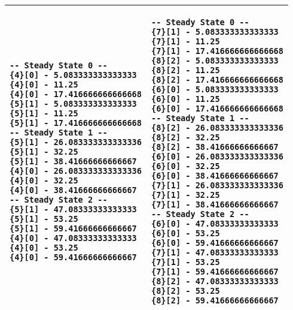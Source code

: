 \begin{center}
    \begin{tabular}{ | p{5cm} | p{5cm} | }
	\hline
	\begin{verbatim}
-- Steady State 0 --
{4}[0] - 5.083333333333333
{4}[0] - 11.25
{4}[0] - 17.416666666666668
{5}[1] - 5.083333333333333
{5}[1] - 11.25
{5}[1] - 17.416666666666668
-- Steady State 1 --
{5}[1] - 26.083333333333336
{5}[1] - 32.25
{5}[1] - 38.41666666666667
{4}[0] - 26.083333333333336
{4}[0] - 32.25
{4}[0] - 38.41666666666667
-- Steady State 2 --
{5}[1] - 47.08333333333333
{5}[1] - 53.25
{5}[1] - 59.41666666666667
{4}[0] - 47.08333333333333
{4}[0] - 53.25
{4}[0] - 59.41666666666667
\end{verbatim}
&
	\begin{verbatim}
-- Steady State 0 --
{7}[1] - 5.083333333333333
{7}[1] - 11.25
{7}[1] - 17.416666666666668
{8}[2] - 5.083333333333333
{8}[2] - 11.25
{8}[2] - 17.416666666666668
{6}[0] - 5.083333333333333
{6}[0] - 11.25
{6}[0] - 17.416666666666668
-- Steady State 1 --
{8}[2] - 26.083333333333336
{8}[2] - 32.25
{8}[2] - 38.41666666666667
{6}[0] - 26.083333333333336
{6}[0] - 32.25
{6}[0] - 38.41666666666667
{7}[1] - 26.083333333333336
{7}[1] - 32.25
{7}[1] - 38.41666666666667
-- Steady State 2 --
{6}[0] - 47.08333333333333
{6}[0] - 53.25
{6}[0] - 59.41666666666667
{7}[1] - 47.08333333333333
{7}[1] - 53.25
{7}[1] - 59.41666666666667
{8}[2] - 47.08333333333333
{8}[2] - 53.25
{8}[2] - 59.41666666666667
\end{verbatim}
\\ \hline
    \end{tabular}
\end{center}